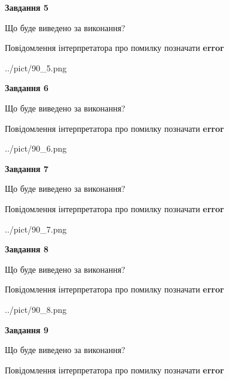 \documentclass[11pt, ukrainian]{article}
\begin{document}
{\begin {large}
{\begin {center}\textbf{Завдання 5}\end {center}}\par
Що буде виведено за виконання? \par
Повідомлення інтерпретатора про помилку позначати \textbf{error}

\begin{center}
	{../pict/90_5.png}
\end{center}
\newpage

{\begin {center}\textbf{Завдання 6}\end {center}}\par
Що буде виведено за виконання? \par
Повідомлення інтерпретатора про помилку позначати \textbf{error}

\begin{center}
	{../pict/90_6.png}
\end{center}
\newpage

{\begin {center}\textbf{Завдання 7}\end {center}}\par
Що буде виведено за виконання? \par
Повідомлення інтерпретатора про помилку позначати \textbf{error}

\begin{center}
	{../pict/90_7.png}
\end{center}
\newpage

{\begin {center}\textbf{Завдання 8}\end {center}}\par
Що буде виведено за виконання? \par
Повідомлення інтерпретатора про помилку позначати \textbf{error}

\begin{center}
	{../pict/90_8.png}
\end{center}
\newpage

{\begin {center}\textbf{Завдання 9}\end {center}}\par
Що буде виведено за виконання? \par
Повідомлення інтерпретатора про помилку позначати \textbf{error}


\end{large}}
\end{document}
